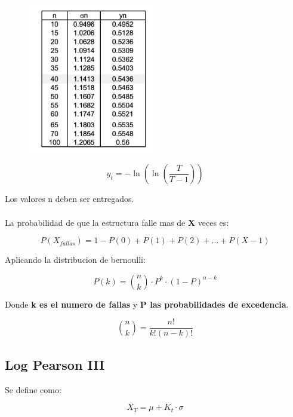 \begin{figure}[H]
    \centering
    \includegraphics[width=0.5\textwidth]{imagenes/tabla_valores_gumbell.jpg}
    \label{fig:valores}
\end{figure}

\begin{equation}
    y_t = -\ln(\ln(\frac{T}{T-1}))
\end{equation}

Los valores n deben ser entregados.
\\ \\
La probabilidad de que la estructura falle mas de \textbf{X} veces es:

\begin{equation}
    P(X_{fallas}) = 1 - P(0) + P(1) + P(2) + ... + P(X-1)
\end{equation}

Aplicando la distribucion de bernoulli:

\begin{equation}
    P(k) = \binom{n}{k} \cdot P^k \cdot (1-P)^{n-k}
\end{equation}

Donde \textbf{k es el numero de fallas} y \textbf{P las probabilidades de excedencia}.

\begin{equation}
    \binom{n}{k} = \frac{n!}{k!(n-k)!}
\end{equation}

\subsection{Log Pearson III}

Se define como:

\begin{equation}
    X_T = \mu + K_t \cdot \sigma
\end{equation}

